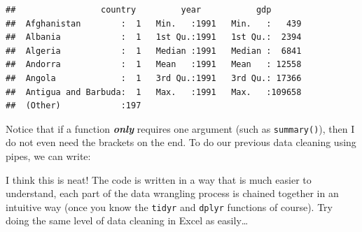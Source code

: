 \documentclass[]{book}
\newenvironment{Shaded}{\begin{snugshade}}{\end{snugshade}}
\newcommand{\KeywordTok}[1]{\textcolor[rgb]{0.13,0.29,0.53}{\textbf{{#1}}}}
\newcommand{\DataTypeTok}[1]{\textcolor[rgb]{0.13,0.29,0.53}{{#1}}}
\newcommand{\DecValTok}[1]{\textcolor[rgb]{0.00,0.00,0.81}{{#1}}}
\newcommand{\StringTok}[1]{\textcolor[rgb]{0.31,0.60,0.02}{{#1}}}
\newcommand{\NormalTok}[1]{{#1}}
\theoremstyle{definition}
\theoremstyle{definition}
\theoremstyle{definition}
\theoremstyle{remark}
\begin{document}
\begin{verbatim}
##                 country         year           gdp        
##  Afghanistan        :  1   Min.   :1991   Min.   :   439  
##  Albania            :  1   1st Qu.:1991   1st Qu.:  2394  
##  Algeria            :  1   Median :1991   Median :  6841  
##  Andorra            :  1   Mean   :1991   Mean   : 12558  
##  Angola             :  1   3rd Qu.:1991   3rd Qu.: 17366  
##  Antigua and Barbuda:  1   Max.   :1991   Max.   :109658  
##  (Other)            :197
\end{verbatim}

Notice that if a function \textbf{\emph{only}} requires one argument
(such as \texttt{summary()}), then I do not even need the brackets on
the end. To do our previous data cleaning using pipes, we can write:

\begin{Shaded}
\end{Shaded}

I think this is neat! The code is written in a way that is much easier
to understand, each part of the data wrangling process is chained
together in an intuitive way (once you know the \texttt{tidyr} and
\texttt{dplyr} functions of course). Try doing the same level of data
cleaning in Excel as easily\ldots{}
\end{document}
